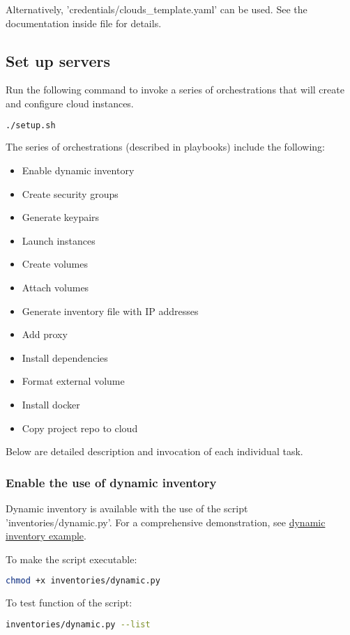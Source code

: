 Alternatively, 'credentials/clouds\_template.yaml' can be used. See the documentation inside file for details.  

\subsection{Set up servers}
Run the following command to invoke a series of orchestrations that will create and configure cloud instances.  
\begin{lstlisting}[language=bash]
./setup.sh
\end{lstlisting}

The series of orchestrations (described in playbooks) include the following:  
\begin{itemize}
  \item Enable dynamic inventory  
  \item Create security groups  
  \item Generate keypairs  
  \item Launch instances  
  \item Create volumes  
  \item Attach volumes  
  \item Generate inventory file with IP addresses  
  \item Add proxy
  \item Install dependencies
  \item Format external volume
  \item Install docker
  \item Copy project repo to cloud
\end{itemize}

Below are detailed description and invocation of each individual task.  

\subsubsection{Enable the use of dynamic inventory}
Dynamic inventory is available with the use of the script 'inventories/dynamic.py'. For a comprehensive demonstration,
see \href{https://docs.ansible.com/ansible/latest/user_guide/intro_dynamic_inventory.html#inventory-script-example-openstack}{dynamic inventory example}.  

To make the script executable:  
\begin{lstlisting}[language=bash]
chmod +x inventories/dynamic.py
\end{lstlisting}

To test function of the script:  
\begin{lstlisting}[language=bash]
inventories/dynamic.py --list
\end{lstlisting}

